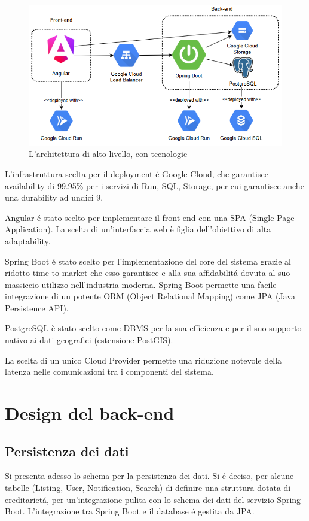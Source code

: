 \begin{figure}[h]
    \centering
    \includegraphics[width=\textwidth]{assets/diagrams/high-level-arch-tecnologies.png}
    \caption{L'architettura di alto livello, con tecnologie}
    \label{fig:Architettura di alto livello, con tecnologie}
\end{figure}

L'infrastruttura scelta per il deployment é Google Cloud, che garantisce availability 
di 99.95\% per i servizi di Run, SQL, Storage, per cui garantisce anche una durability 
ad undici 9.

Angular é stato scelto per implementare il front-end con una SPA (Single Page 
Application). La scelta di un'interfaccia web è figlia dell'obiettivo di alta 
adaptability.

Spring Boot é stato scelto per l'implementazione del core del sistema grazie al ridotto 
time-to-market che esso garantisce e alla sua affidabilitá dovuta al suo massiccio 
utilizzo nell'industria moderna. Spring Boot permette una facile integrazione di un 
potente ORM (Object Relational Mapping) come JPA (Java Persistence API).

PostgreSQL è stato scelto come DBMS per la sua efficienza e per il suo supporto nativo 
ai dati geografici (estensione PostGIS).

La scelta di un unico Cloud Provider permette una riduzione notevole della latenza nelle 
comunicazioni tra i componenti del sistema.

\section{Design del back-end}

\subsection{Persistenza dei dati}
Si presenta adesso lo schema per la persistenza dei dati.
Si é deciso, per alcune tabelle (Listing, User, Notification, Search) di definire
una struttura dotata di ereditarietá, per un'integrazione pulita con lo schema dei dati
del servizio Spring Boot. L'integrazione tra Spring Boot e il database é gestita da JPA.

